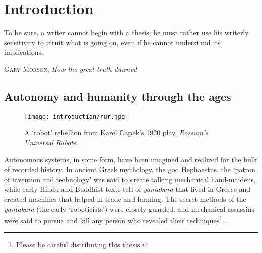 \chapter{Introduction}
\label{ch:intro}
\epigraph{To be sure, a writer cannot begin with a thesis; he must rather use his writerly sensitivity to intuit what is going on, even if he cannot understand its implications.}{\textsc{Gary Morson}, \textit{How the great truth dawned}}
 

\section{Autonomy and humanity through the ages}
\begin{wrapfigure}{r}{0.5\textwidth}
  \begin{center}
  	\vspace{-20pt}
    \texttt{[image: introduction/rur.jpg]}
     \vspace{-15pt}
  \end{center}
  \caption{A `robot' rebellion from Karel Capek's 1920 play, \textit{Rossum's Universal Robots}.}
  \vspace{-5pt}
  \label{fig:into_rur}
\end{wrapfigure}

Autonomous systems, in some form, have been imagined and realized for the bulk of recorded history. In ancient Greek mythology, the god Hephaestus, the `patron of invention and technology' \citep{MayorGodsRobots2019} was said to create talking mechanical hand-maidens, while early Hindu and Buddhist texts tell of \textit{yantakara} that lived in Greece and created machines that helped in trade and farming. The secret methods of the \textit{yantakara} (the early `roboticists') were closely guarded, and mechanical assassins were said to pursue and kill any person who revealed their techniques\footnote{Please be careful distributing this thesis.} \citep{MayorGodsRobots2019}. 


